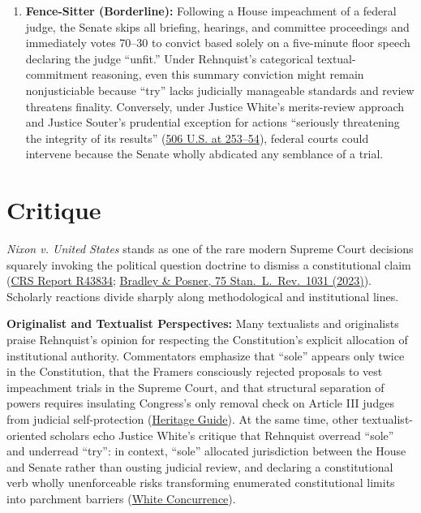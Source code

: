 \documentclass[12pt]{article}
\begin{document}
\begin{enumerate}
\item \textbf{Fence-Sitter (Borderline):} Following a House impeachment of a federal judge, the Senate skips all briefing, hearings, and committee proceedings and immediately votes 70--30 to convict based solely on a five-minute floor speech declaring the judge ``unfit.'' Under Rehnquist's categorical textual-commitment reasoning, even this summary conviction might remain nonjusticiable because ``try'' lacks judicially manageable standards and review threatens finality. Conversely, under Justice White's merits-review approach and Justice Souter's prudential exception for actions ``seriously threatening the integrity of its results'' (\href{https://supreme.justia.com/cases/federal/us/506/224/}{506 U.S. at 253--54}), federal courts could intervene because the Senate wholly abdicated any semblance of a trial.
\end{enumerate}

\section{Critique}

\textit{Nixon v. United States} stands as one of the rare modern Supreme Court decisions squarely invoking the political question doctrine to dismiss a constitutional claim (\href{https://www.everycrsreport.com/reports/R43834.html}{CRS Report R43834}; \href{https://review.law.stanford.edu/wp-content/uploads/sites/3/2023/05/Bradley-Posner-75-Stan.-L.-Rev.-1031.pdf}{Bradley \& Posner, 75 Stan.\ L.\ Rev.\ 1031 (2023)}). Scholarly reactions divide sharply along methodological and institutional lines.

\textbf{Originalist and Textualist Perspectives:} Many textualists and originalists praise Rehnquist's opinion for respecting the Constitution's explicit allocation of institutional authority. Commentators emphasize that ``sole'' appears only twice in the Constitution, that the Framers consciously rejected proposals to vest impeachment trials in the Supreme Court, and that structural separation of powers requires insulating Congress's only removal check on Article III judges from judicial self-protection (\href{https://constitution.heritage.org/essays/a1-s2-c5-b/}{Heritage Guide}). At the same time, other textualist-oriented scholars echo Justice White's critique that Rehnquist overread ``sole'' and underread ``try'': in context, ``sole'' allocated jurisdiction between the House and Senate rather than ousting judicial review, and declaring a constitutional verb wholly unenforceable risks transforming enumerated constitutional limits into parchment barriers (\href{https://www.law.cornell.edu/supct/html/91-740.ZC1.html}{White Concurrence}).
\end{document}
